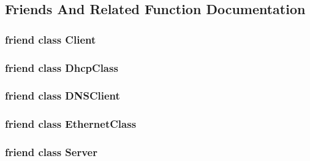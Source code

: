 \subsection{Friends And Related Function Documentation}
\hypertarget{class_i_p_address_a5db1c99e2c94b26278f3838c85cdb618}{
\subsubsection[{Client}]{\setlength{\rightskip}{0pt plus 5cm}friend class Client\hspace{0.3cm}{\ttfamily [friend]}}}\label{class_i_p_address_a5db1c99e2c94b26278f3838c85cdb618}
\hypertarget{class_i_p_address_afef6ad9b691e32ea60d87db719e23e15}{
\subsubsection[{Dhcp\-Class}]{\setlength{\rightskip}{0pt plus 5cm}friend class Dhcp\-Class\hspace{0.3cm}{\ttfamily [friend]}}}\label{class_i_p_address_afef6ad9b691e32ea60d87db719e23e15}
\hypertarget{class_i_p_address_a14acdf960f52e4a43740d57e81a27c40}{
\subsubsection[{D\-N\-S\-Client}]{\setlength{\rightskip}{0pt plus 5cm}friend class D\-N\-S\-Client\hspace{0.3cm}{\ttfamily [friend]}}}\label{class_i_p_address_a14acdf960f52e4a43740d57e81a27c40}
\hypertarget{class_i_p_address_a9a150ffc237e50529b3d0d50cc83a4d7}{
\subsubsection[{Ethernet\-Class}]{\setlength{\rightskip}{0pt plus 5cm}friend class Ethernet\-Class\hspace{0.3cm}{\ttfamily [friend]}}}\label{class_i_p_address_a9a150ffc237e50529b3d0d50cc83a4d7}
\hypertarget{class_i_p_address_ac2055578ac48afabe5af487878450f68}{
\subsubsection[{Server}]{\setlength{\rightskip}{0pt plus 5cm}friend class Server\hspace{0.3cm}{\ttfamily [friend]}}}\label{class_i_p_address_ac2055578ac48afabe5af487878450f68}
